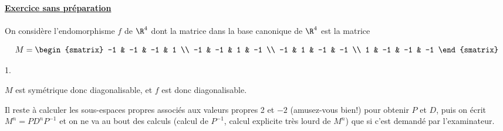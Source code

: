 \documentclass[11pt]{article}%
\begin{document}
\begin{exercice}
 

 \noindent \textbf{\underline{Exercice sans préparation}}
 \\
\\
 On considère l'endomorphisme $f$ de $\R^{4}$ dont la matrice
 dans la base canonique de $\R^{4}$ est la matrice 
 
\[
 M = \begin{smatrix}
 -1 & -1 & -1 & 1 \\
 -1 & -1 & 1 & -1 \\
 -1 & 1 & -1 & -1 \\
 1 & -1 & -1 & -1
\end{smatrix}
\]

 \begin{noliste}{1.}
 \setlength{\itemsep}{4mm}
 \item $M$ est symétrique donc diagonalisable, et $f$ est donc
diagonalisable. \\

 \item Il reste à calculer les sous-espaces propres associés aux
valeurs propres 2 et $-2$ (amusez-vous bien!) pour obtenir $P$ et $D$,
puis on écrit $M^{n} = P D^{n} P^{-1}$ et on ne va au bout des calculs
(calcul de $P^{-1}$, calcul explicite très lourd de $M^{n}$) que si
c'est demandé par l'examinateur. \\
 \end{noliste}
 \end{exercice}

 \newpage
\end{document}
